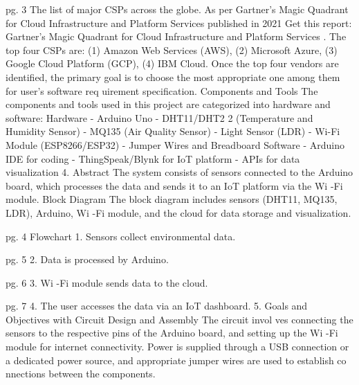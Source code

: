 \documentclass{article}
\begin{document}
 pg. 3 The list of major CSPs across the globe. As per Gartner's Magic Quadrant for Cloud  Infrastructure and Platform Services published in 2021 {Get this report: Gartner's Magic  Quadrant for Cloud Infrastructure and Platform Services} .  The top four CSPs are:   (1) Amazon Web Services (AWS),   (2) Microsoft Azure,   (3) Google Cloud Platform (GCP),   (4) IBM Cloud.   Once the top four vendors are identified, the primary goal is to choose the most appropriate  one among them for user's software req uirement specification.   Components and Tools   The components and tools used in this project are categorized into hardware and software:   Hardware   - Arduino Uno   - DHT11/DHT2 2 (Temperature and Humidity Sensor)   - MQ135 (Air Quality Sensor)   - Light Sensor (LDR)   - Wi-Fi Module (ESP8266/ESP32)   - Jumper Wires and Breadboard   Software   - Arduino IDE for coding   - ThingSpeak/Blynk for IoT platform   - APIs for data visualization   4. Abstract   The system consists of sensors connected to the Arduino board, which processes the data  and sends it to an IoT platform via the Wi -Fi module.   Block Diagram   The block diagram includes sensors (DHT11, MQ135, LDR), Arduino, Wi -Fi module, and the  cloud for  data storage and visualization.  

 pg. 4   Flowchart   1. Sensors collect environmental data.         

 pg. 5 2. Data is processed by Arduino.                     

 pg. 6 3. Wi -Fi module sends data to the cloud.                     

 pg. 7 4. The user accesses the data via an IoT dashboard.       5. Goals and Objectives with Circuit Design and Assembly   The circuit invol ves connecting the sensors to the respective pins of the Arduino board, and  setting up the Wi -Fi module for internet connectivity.   Power is supplied through a USB connection or a dedicated power source, and appropriate  jumper wires are used to establish co nnections between the components.   
\end{document}
